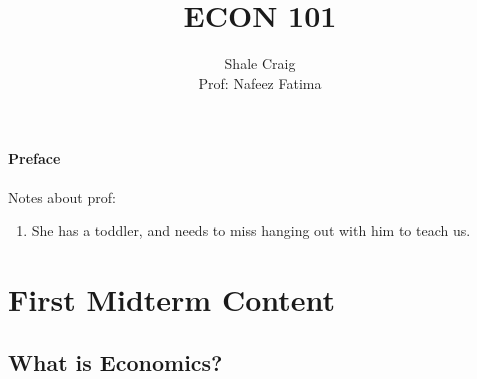 \ifdefined\isphone
  
\else
  
\fi

\usepackage{siunitx}

\title{ECON 101}

\author{Shale Craig \\
Prof: Nafeez Fatima}


    \maketitle

    \tableofcontents

    \mainmatter

    \subsection*{Preface} %
    \label{sub:preface}
        Notes about prof:

        \begin{enumerate}
            \item She has a toddler, and needs to miss hanging out with him to teach us.
        \end{enumerate}

    \part{First Midterm Content} %
    \label{prt:first_ _midterm_ _content_}

        \chapter{What is Economics?} %
        \label{cha:what_is_economics_}

